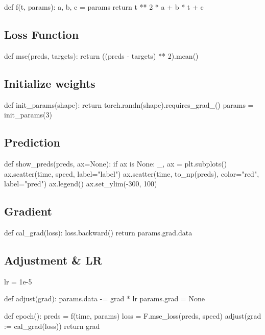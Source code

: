 \documentclass{article}
\newenvironment{monos}{\VerbatimEnvironment\begin{pythoncode}}{\end{pythoncode}}
\begin{document}
\begin{monos}
def f(t, params):
    a, b, c = params
    return t ** 2 * a + b * t + c
\end{monos}

\subsection{Loss Function}

\begin{monos}
def mse(preds, targets):
    return ((preds - targets) ** 2).mean()
\end{monos}

\subsection{Initialize weights}

\begin{monos}
def init_params(shape):
    return torch.randn(shape).requires_grad_()
params = init_params(3)
\end{monos}

\subsection{Prediction}

\begin{monos}
def show_preds(preds, ax=None):
    if ax is None:
        _, ax = plt.subplots()
    ax.scatter(time, speed, label="label")
    ax.scatter(time, to_np(preds), color="red", label="pred")
    ax.legend()
    ax.set_ylim(-300, 100)
\end{monos}

\subsection{Gradient}

\begin{monos}
def cal_grad(loss):
    loss.backward()
    return params.grad.data
\end{monos}

\subsection{Adjustment \& LR}

\begin{monos}
lr = 1e-5

def adjust(grad):
    params.data -= grad * lr
    params.grad = None

def epoch():
    preds = f(time, params)
    loss = F.mse_loss(preds, speed)
    adjust(grad := cal_grad(loss))
    return grad
\end{monos}
\end{document}
